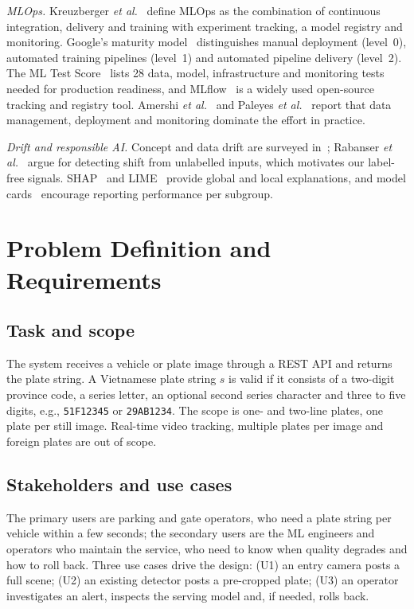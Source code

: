\documentclass[conference]{IEEEtran}
\newcommand{\code}[1]{\texttt{#1}}
\begin{document}
\textit{MLOps.} Kreuzberger \emph{et al.}~\cite{kreuzberger2023mlops} define MLOps
as the combination of continuous integration, delivery and training with
experiment tracking, a model registry and monitoring. Google's maturity
model~\cite{google2020mlops} distinguishes manual deployment (level~0), automated
training pipelines (level~1) and automated pipeline delivery (level~2). The ML
Test Score~\cite{breck2017mltest} lists 28 data, model, infrastructure and
monitoring tests needed for production readiness, and MLflow~\cite{zaharia2018mlflow}
is a widely used open-source tracking and registry tool. Amershi \emph{et
al.}~\cite{amershi2019se4ml} and Paleyes \emph{et al.}~\cite{paleyes2022challenges}
report that data management, deployment and monitoring dominate the effort in
practice.

\textit{Drift and responsible AI.} Concept and data drift are surveyed
in~\cite{gama2014drift,lu2019drift}; Rabanser \emph{et al.}~\cite{rabanser2019failing}
argue for detecting shift from unlabelled inputs, which motivates our label-free
signals. SHAP~\cite{lundberg2017shap} and LIME~\cite{ribeiro2016lime} provide global
and local explanations, and model cards~\cite{mitchell2019modelcards} encourage
reporting performance per subgroup.

\section{Problem Definition and Requirements}\label{sec:problem}
\subsection{Task and scope}
The system receives a vehicle or plate image through a REST API and returns the
plate string. A Vietnamese plate string $s$ is valid if it consists of a
two-digit province code, a series letter, an optional second series character
and three to five digits, e.g., \code{51F12345} or \code{29AB1234}. The scope is
one- and two-line plates, one plate per still image. Real-time video tracking,
multiple plates per image and foreign plates are out of scope.

\subsection{Stakeholders and use cases}
The primary users are parking and gate operators, who need a plate string per
vehicle within a few seconds; the secondary users are the ML engineers and
operators who maintain the service, who need to know when quality degrades and
how to roll back. Three use cases drive the design: (U1) an entry camera posts a
full scene; (U2) an existing detector posts a pre-cropped plate; (U3) an operator
investigates an alert, inspects the serving model and, if needed, rolls back.
\end{document}
